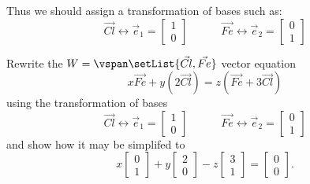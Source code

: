 \begin{applicationActivities}
\begin{observation}
  \vspace{1em}

  Thus we should assign a transformation of bases such as:
  \[
    \vec{Cl}
      \leftrightarrow
    \vec e_1
      =
    \begin{bmatrix}
      1\\0
    \end{bmatrix}
    \hspace{3em}
    \vec{Fe}
      \leftrightarrow
    \vec e_2
      =
    \begin{bmatrix}
      0\\1
    \end{bmatrix}
  \]
\end{observation}

\begin{activity}{10}
  Rewrite the \(W=\vspan\setList{\vec{Cl},\vec{Fe}}\) vector equation
  \[
    x\vec{Fe} + y(2\vec{Cl})
      =
    z(\vec{Fe}+3\vec{Cl})
  \]
  using the transformation of bases
  \[
    \vec{Cl}
      \leftrightarrow
    \vec e_1
      =
    \begin{bmatrix}
      1\\0
    \end{bmatrix}
    \hspace{3em}
    \vec{Fe}
      \leftrightarrow
    \vec e_2
      =
    \begin{bmatrix}
      0\\1
    \end{bmatrix}
  \]
  and show how it may be simplifed to
  \[
    x\begin{bmatrix}0\\1\end{bmatrix}
      +
    y\begin{bmatrix}2\\0\end{bmatrix}
      -
    z\begin{bmatrix}3\\1\end{bmatrix}
      =
    \begin{bmatrix}0\\0\end{bmatrix}
  .\]
\end{activity}


\end{applicationActivities}
